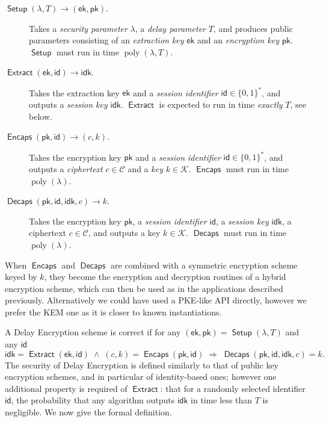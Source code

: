 \documentclass{llncs}
\DeclareMathOperator{\poly}{poly}
\DeclareMathOperator{\Setup}{\mathsf{Setup}}
\DeclareMathOperator{\Extract}{\mathsf{Extract}}
\DeclareMathOperator{\Encaps}{\mathsf{Encaps}}
\DeclareMathOperator{\Decaps}{\mathsf{Decaps}}
\newcommand{\ek}{\mathsf{ek}}
\newcommand{\pk}{\mathsf{pk}}
\newcommand{\id}{\mathsf{id}}
\newcommand{\idk}{\mathsf{idk}}
\newcommand{\keyspace}{\mathcal{K}}
\newcommand{\cipherspace}{\mathcal{C}}
\begin{document}
\begin{description}
\item[$\Setup(\lambda, T) \to (\ek,\pk)$.] %
  Takes a \emph{security parameter} $\lambda$, a \emph{delay
    parameter} $T$, and produces public parameters consisting of an
  \emph{extraction key} $\ek$ and an \emph{encryption key} $\pk$. %
  $\Setup$ must run in time $\poly(\lambda,T)$.
\item[$\Extract(\ek,\id) \to \idk$.] %
  Takes the extraction key $\ek$ and a \emph{session identifier}
  $\id\in\{0,1\}^*$, and outputs a \emph{session key} $\idk$. %
  $\Extract$ is expected to run in time \emph{exactly} $T$, see below.
\item[$\Encaps(\pk,\id)\to (c,k)$.] %
  Takes the encryption key $\pk$ and a \emph{session identifier}
  $\id\in\{0,1\}^*$, and outputs a \emph{ciphertext}
  $c\in\cipherspace$ and a \emph{key} $k\in\keyspace$. %
  $\Encaps$ must run in time $\poly(\lambda)$.
\item[$\Decaps(\pk,\id,\idk,c)\to k$.] %
  Takes the encryption key $\pk$, a \emph{session identifier}
  $\id$, a \emph{session key} $\idk$, a ciphertext $c\in\cipherspace$,
  and outputs a key $k\in\keyspace$. %
  $\Decaps$ must run in time $\poly(\lambda)$.
\end{description}

When $\Encaps$ and $\Decaps$ are combined with a symmetric encryption
scheme keyed by $k$, they become the encryption and decryption
routines of a hybrid encryption scheme, which can then be used as in
the applications described previously. %
Alternatively we could have used a PKE-like API directly, however we
prefer the KEM one as it is closer to known instantiations.

A Delay Encryption scheme is correct if for any
$(\ek,\pk)=\Setup(\lambda,T)$ and any $\id$
\[\idk=\Extract(\ek,\id)
  \;\wedge\;
  (c,k) = \Encaps(\pk,\id)
  \;\Rightarrow\;
  \Decaps(\pk,\id,\idk,c) = k.\]
The security of Delay Encryption is defined similarly to that of
public key encryption schemes, and in particular of identity-based
ones; however one additional property is required of $\Extract$: that
for a randomly selected identifier $\id$, the probability that any
algorithm outputs $\idk$ in time less than $T$ is negligible. %
We now give the formal definition.
\end{document}
